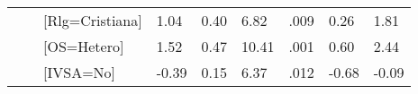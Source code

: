 \documentclass[a4paper, 12pt]{article}
\begin{document}
\begin{tabular}{lllllllll}
                                            &                                                                                  & {[}Rlg=Cristiana{]} & 1.04               & 0.40                & 6.82                  & .009                   & 0.26         & 1.81         \\
                                            &                                                                                  & {[}OS=Hetero{]}     & 1.52               & 0.47                & 10.41                 & .001                   & 0.60         & 2.44         \\
                                            &                                                                                  & {[}IVSA=No{]}       & -0.39               & 0.15                & 6.37                  & .012                   & -0.68        & -0.09        \\ \hline
\end{tabular}
\end{document}

